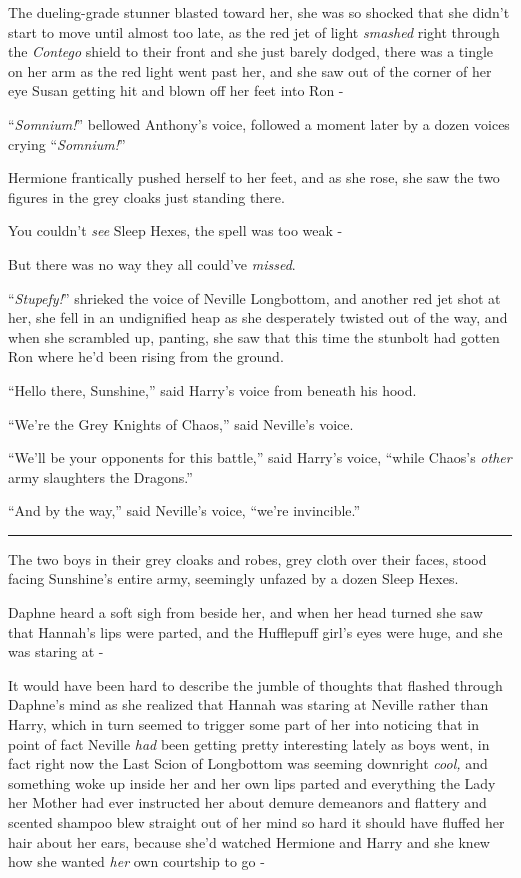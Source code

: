 The dueling-grade stunner blasted toward her, she was so shocked that she didn't start to move until almost too late, as the red jet of light \emph{smashed} right through the \emph{Contego} shield to their front and she just barely dodged, there was a tingle on her arm as the red light went past her, and she saw out of the corner of her eye Susan getting hit and blown off her feet into Ron -

``\emph{Somnium!}'' bellowed Anthony's voice, followed a moment later by a dozen voices crying ``\emph{Somnium!}''

Hermione frantically pushed herself to her feet, and as she rose, she saw the two figures in the grey cloaks just standing there.

You couldn't \emph{see} Sleep Hexes, the spell was too weak -

But there was no way they all could've \emph{missed}.

``\emph{Stupefy!}'' shrieked the voice of Neville Longbottom, and another red jet shot at her, she fell in an undignified heap as she desperately twisted out of the way, and when she scrambled up, panting, she saw that this time the stunbolt had gotten Ron where he'd been rising from the ground.

``Hello there, Sunshine,'' said Harry's voice from beneath his hood.

``We're the Grey Knights of Chaos,'' said Neville's voice.

``We'll be your opponents for this battle,'' said Harry's voice, ``while Chaos's \emph{other} army slaughters the Dragons.''

``And by the way,'' said Neville's voice, ``we're invincible.''

\begin{center}\rule{3in}{0.4pt}\end{center}

The two boys in their grey cloaks and robes, grey cloth over their faces, stood facing Sunshine's entire army, seemingly unfazed by a dozen Sleep Hexes.

Daphne heard a soft sigh from beside her, and when her head turned she saw that Hannah's lips were parted, and the Hufflepuff girl's eyes were huge, and she was staring at -

It would have been hard to describe the jumble of thoughts that flashed through Daphne's mind as she realized that Hannah was staring at Neville rather than Harry, which in turn seemed to trigger some part of her into noticing that in point of fact Neville \emph{had} been getting pretty interesting lately as boys went, in fact right now the Last Scion of Longbottom was seeming downright \emph{cool,} and something woke up inside her and her own lips parted and everything the Lady her Mother had ever instructed her about demure demeanors and flattery and scented shampoo blew straight out of her mind so hard it should have fluffed her hair about her ears, because she'd watched Hermione and Harry and she knew how she wanted \emph{her} own courtship to go -

